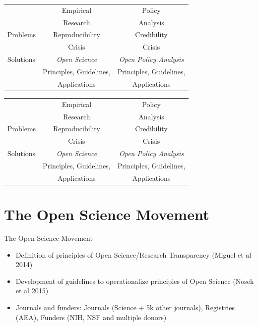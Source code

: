 \documentclass{beamer}
\def\white{\color{white}}
\begin{document}
\begin{frame}{}
\begin{table}[ht]
\centering
\begin{tabular}[t]{|l|c|c|}
\hline
& Empirical  & Policy \\
& Research & Analysis \\

\hline
Problems & Reproducibility  &  Credibility \\
				 &  Crisis & Crisis \\
\hline
Solutions & {\white  \textit{Open Science } }&    {\white \textit{Open Policy Analysis } }\\
 &   {\white Principles, Guidelines, } &   {\white Principles, Guidelines,}\\
 &  {\white  Applications} &   {\white Applications}\\

\hline
\end{tabular}
\end{table}%
\end{frame}




\begin{frame}[noframenumbering]{}
\begin{table}[ht]
\centering
\begin{tabular}[t]{|l|c|c|}
\hline
& Empirical  & Policy \\
& Research & Analysis \\

\hline
Problems & Reproducibility  &  Credibility \\
				 &  Crisis & Crisis \\
\hline
Solutions &  \textit{Open Science }&    {\white \textit{Open Policy Analysis } }\\
 &   Principles, Guidelines, &   {\white Principles, Guidelines,}\\
 &    Applications  &   {\white Applications}\\

\hline
\end{tabular}
\end{table}%
\end{frame}

\section[Open Science]{The Open Science Movement}

\begin{frame}{The Open Science Movement}

\begin{itemize}
\item Definition of principles of Open Science/Research Transparency (Miguel et al 2014)
\item Development of guidelines to operationalize principles of Open Science (Nosek et al 2015)
\item Journals and funders: Journals (Science + 5k other journals), Registries (AEA), Funders (NIH, NSF and multiple donors)
\end{itemize}

\end{frame} 
\end{document}
